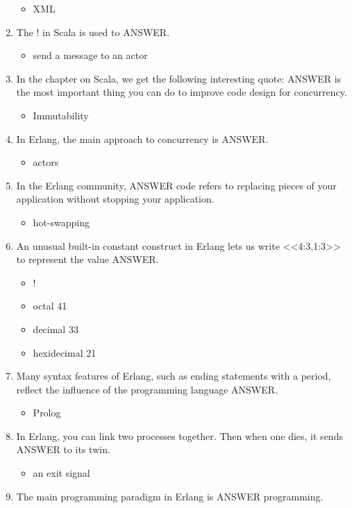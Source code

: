 \documentclass{exam}
\begin{document}
\begin{enumerate}
\begin{itemize}
\item XML
\end{itemize}
\item The ! in Scala is used to ANSWER.
\begin{itemize}
\item send a message to an actor
\end{itemize}
\item In the chapter on Scala, we get the following interesting quote: ANSWER is the most important thing you can do to improve code design for concurrency.
\begin{itemize}
\item Immutability
\end{itemize}
\item In Erlang, the main approach to concurrency is ANSWER.
\begin{itemize}
\item actors
\end{itemize}
\item In the Erlang community, ANSWER code refers to replacing pieces of your application without stopping your application.
\begin{itemize}
\item hot-swapping
\end{itemize}
\item An unusual built-in constant construct in Erlang lets us write <<4:3,1:3>> to represent the value ANSWER.
\begin{itemize}
\item !
\item octal 41
\item decimal 33
\item hexidecimal 21
\end{itemize}
\item Many syntax features of Erlang, such as ending statements with a period, reflect the influence of the programming language ANSWER.
\begin{itemize}
\item Prolog
\end{itemize}
\item In Erlang, you can link two processes together.  Then when one dies, it sends ANSWER to its twin.
\begin{itemize}
\item an exit signal
\end{itemize}
\item The main programming paradigm in Erlang is ANSWER programming.

\end{enumerate}
\end{document}
